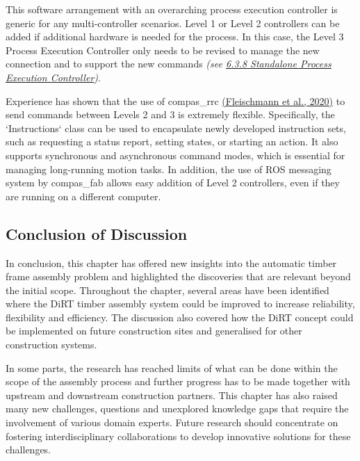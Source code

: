 \documentclass[11pt]{book}
\begin{document}
This software arrangement with an overarching process execution controller is generic for any multi-controller scenarios. Level 1 or Level 2 controllers can be added if additional hardware is needed for the process. In this case, the Level 3 Process Execution Controller only needs to be revised to manage the new connection and to support the new commands \textit{(see \uline{6.3.8 Standalone Process Execution Controller})}. 

Experience has shown that the use of compas\_rrc \href{https://www.zotero.org/google-docs/?svtqbp}{(Fleischmann et al., 2020)} to send commands between Levels 2 and 3 is extremely flexible. Specifically, the `Instructions` class can be used to encapsulate newly developed instruction sets, such as requesting a status report, setting states, or starting an action. It also supports synchronous and asynchronous command modes, which is essential for managing long-running motion tasks. In addition, the use of ROS messaging system by compas\_fab allows easy addition of Level 2 controllers, even if they are running on a different computer. 

\subsection{Conclusion of Discussion}

In conclusion, this chapter has offered new insights into the automatic timber frame assembly problem and highlighted the discoveries that are relevant beyond the initial scope. Throughout the chapter, several areas have been identified where the DiRT timber assembly system could be improved to increase reliability, flexibility and efficiency. The discussion also covered how the DiRT concept could be implemented on future construction sites and generalised for other construction systems. 

In some parts, the research has reached limits of what can be done within the scope of the assembly process and further progress has to be made together with upstream and downstream construction partners. This chapter has also raised many new challenges, questions and unexplored knowledge gaps that require the involvement of various domain experts. Future research should concentrate on fostering interdisciplinary collaborations to develop innovative solutions for these challenges.

\vspace{2\baselineskip}

\newpage
\end{document}
